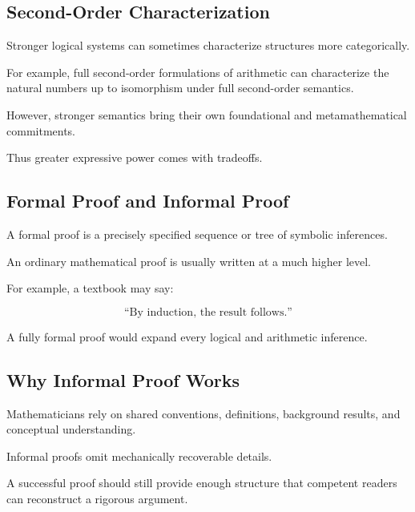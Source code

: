\subsection{Second-Order Characterization}
\label{subsec:second-order-characterization-foundations}

Stronger logical systems can sometimes characterize structures more
categorically.

For example, full second-order formulations of arithmetic can characterize
the natural numbers up to isomorphism under full second-order semantics.

However, stronger semantics bring their own foundational and
metamathematical commitments.

Thus greater expressive power comes with tradeoffs.

\subsection{Formal Proof and Informal Proof}
\label{subsec:formal-versus-informal-proof}

A formal proof is a precisely specified sequence or tree of symbolic
inferences.

An ordinary mathematical proof is usually written at a much higher level.

For example, a textbook may say:

\[
\boxed{
\text{``By induction, the result follows.''}
}
\]

A fully formal proof would expand every logical and arithmetic inference.

\subsection{Why Informal Proof Works}
\label{subsec:why-informal-proof-works}

Mathematicians rely on shared conventions, definitions, background results,
and conceptual understanding.

Informal proofs omit mechanically recoverable details.

A successful proof should still provide enough structure that competent
readers can reconstruct a rigorous argument.

